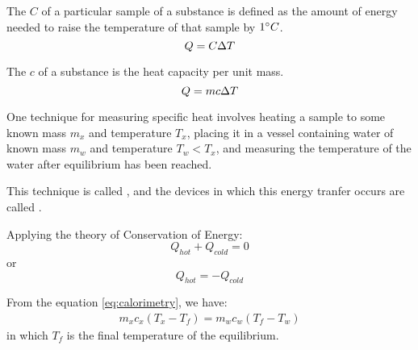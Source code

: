         \par The  $C$ of a particular sample of a substance is
        defined as the amount of energy needed to raise the temperature of that sample by
        $1 \degree C$.
        \begin{equation}
            Q = C \Delta T
        \end{equation}
        \par The  $c$ of a substance is the heat capacity per unit mass.
        \begin{equation}
            Q = mc \Delta T
        \end{equation}
            \par One technique for measuring specific heat involves heating a sample to 
            some known mass $m_{x}$ and temperature $T_{x}$, placing it in a vessel 
            containing water of known mass $m_{w}$ and temperature $T_{w} < T_{x}$, and
            measuring the temperature of the water after equilibrium has been reached.
            \par This technique is called , and the devices in which
            this energy tranfer occurs are called .
            \par Applying the theory of Conservation of Energy:
            \begin{equation}
                Q_{hot} + Q_{cold} = 0
            \end{equation}
            or
            \begin{equation} \label{eq:calorimetry}
                Q_{hot} = - Q_{cold}
            \end{equation}
            \par From the equation \eqref{eq:calorimetry}, we have:
            \begin{align*}
                m_{x}c_{x}(T_{x} - T_{f}) = m_{w}c_{w}(T_{f} - T_{w})
            \end{align*}
            in which $T_{f}$ is the final temperature of the equilibrium.
    \hiiEND

